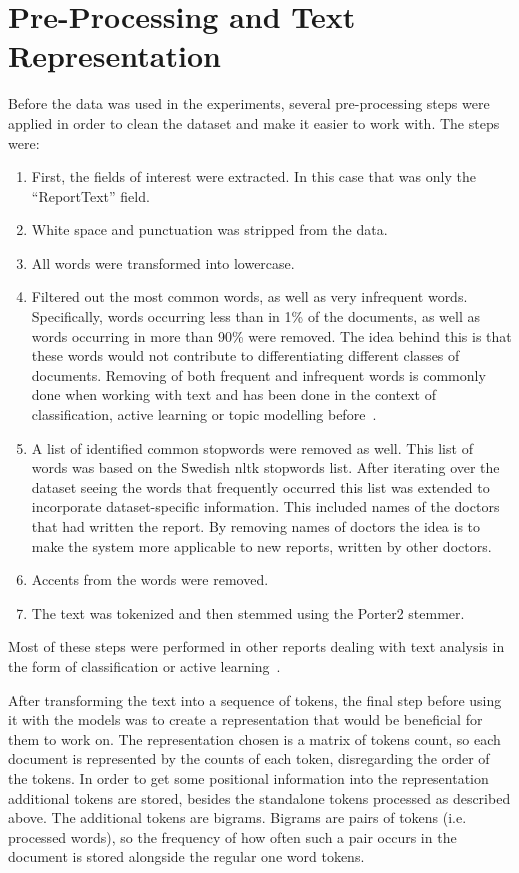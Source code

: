 \section{Pre-Processing and Text Representation}\label{sec:pre-processing}
Before the data was used in the experiments, several pre-processing steps were applied in order to clean the dataset and make it easier to work with.
The steps were:
\begin{enumerate}
    \item First, the fields of interest were extracted.
          In this case that was only the ``ReportText'' field.
    \item White space and punctuation was stripped from the data.
    \item All words were transformed into lowercase.
    \item Filtered out the most common words, as well as very infrequent words.
          Specifically, words occurring less than in 1\% of the documents, as well as words occurring in more than 90\% were removed.
          The idea behind this is that these words would not contribute to differentiating different classes of documents.
          Removing of both frequent and infrequent words is commonly done when working with text and has been done in the context of classification, active learning or topic modelling before~\cite{tong2001support, blei2003latent, brinker2006active, sarioglu2013topic}.
    \item A list of identified common stopwords were removed as well.
          This list of words was based on the Swedish nltk stopwords list.
          After iterating over the dataset seeing the words that frequently occurred this list was extended to incorporate dataset-specific information.
          This included names of the doctors that had written the report.
          By removing names of doctors the idea is to make the system more applicable to new reports, written by other doctors.
    \item Accents from the words were removed.
    \item The text was tokenized and then stemmed using the Porter2 stemmer.
\end{enumerate}
Most of these steps were performed in other reports dealing with text analysis in the form of classification or active learning~\cite{tong2001support, blei2003latent, brinker2006active, sarioglu2013topic}.

After transforming the text into a sequence of tokens, the final step before using it with the models was to create a representation that would be beneficial for them to work on.
The representation chosen is a matrix of tokens count, so each document is represented by the counts of each token, disregarding the order of the tokens.
In order to get some positional information into the representation additional tokens are stored, besides the standalone tokens processed as described above.
The additional tokens are bigrams.
Bigrams are pairs of tokens (i.e. processed words), so the frequency of how often such a pair occurs in the document is stored alongside the regular one word tokens.

